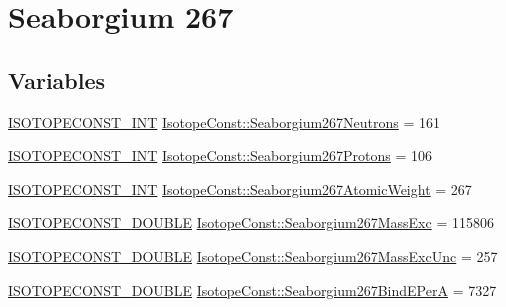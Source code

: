\hypertarget{group___isotope_const-_seaborgium-_sg267}{}\section{Seaborgium 267}
\label{group___isotope_const-_seaborgium-_sg267}
\subsection*{Variables}
\begin{DoxyCompactItemize}
\item 
\mbox{\hyperlink{group___isotope_const-_macros_ga5f18360b3e99483a35c32d789e62621c}{I\+S\+O\+T\+O\+P\+E\+C\+O\+N\+S\+T\+\_\+\+I\+NT}} \mbox{\hyperlink{group___isotope_const-_seaborgium-_sg267_ga7718e19805957801fa06c3c30d89f6ea}{Isotope\+Const\+::\+Seaborgium267\+Neutrons}} = 161
\item 
\mbox{\hyperlink{group___isotope_const-_macros_ga5f18360b3e99483a35c32d789e62621c}{I\+S\+O\+T\+O\+P\+E\+C\+O\+N\+S\+T\+\_\+\+I\+NT}} \mbox{\hyperlink{group___isotope_const-_seaborgium-_sg267_ga4ba0383cb6af453e4663633903cc767b}{Isotope\+Const\+::\+Seaborgium267\+Protons}} = 106
\item 
\mbox{\hyperlink{group___isotope_const-_macros_ga5f18360b3e99483a35c32d789e62621c}{I\+S\+O\+T\+O\+P\+E\+C\+O\+N\+S\+T\+\_\+\+I\+NT}} \mbox{\hyperlink{group___isotope_const-_seaborgium-_sg267_gab8bd6a50053456628d0f3e07b3778b99}{Isotope\+Const\+::\+Seaborgium267\+Atomic\+Weight}} = 267
\item 
\mbox{\hyperlink{group___isotope_const-_macros_ga8f45a7272ce02c0b4c65c44636ed719a}{I\+S\+O\+T\+O\+P\+E\+C\+O\+N\+S\+T\+\_\+\+D\+O\+U\+B\+LE}} \mbox{\hyperlink{group___isotope_const-_seaborgium-_sg267_ga464ff34fe919614183f776cc604c38c3}{Isotope\+Const\+::\+Seaborgium267\+Mass\+Exc}} = 115806
\item 
\mbox{\hyperlink{group___isotope_const-_macros_ga8f45a7272ce02c0b4c65c44636ed719a}{I\+S\+O\+T\+O\+P\+E\+C\+O\+N\+S\+T\+\_\+\+D\+O\+U\+B\+LE}} \mbox{\hyperlink{group___isotope_const-_seaborgium-_sg267_ga889295c7d1a4a1913df0ce20c08566f8}{Isotope\+Const\+::\+Seaborgium267\+Mass\+Exc\+Unc}} = 257
\item 
\mbox{\hyperlink{group___isotope_const-_macros_ga8f45a7272ce02c0b4c65c44636ed719a}{I\+S\+O\+T\+O\+P\+E\+C\+O\+N\+S\+T\+\_\+\+D\+O\+U\+B\+LE}} \mbox{\hyperlink{group___isotope_const-_seaborgium-_sg267_ga0ea9c74aa8638a7d35d13eb762aa656a}{Isotope\+Const\+::\+Seaborgium267\+Bind\+E\+PerA}} = 7327
\item 

\end{DoxyCompactItemize}
